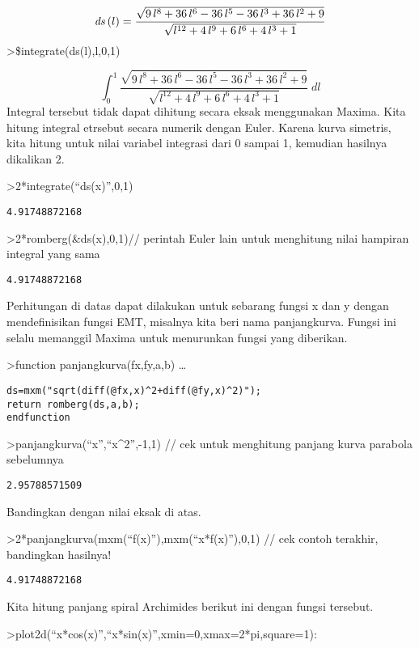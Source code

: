 \documentclass[
]{book}
\begin{document}
\[{\it ds}\left(l\right)=\frac{\sqrt{9\,l^8+36\,l^6-36\,l^5-36\,l^3+  36\,l^2+9}}{\sqrt{l^{12}+4\,l^9+6\,l^6+4\,l^3+1}}\]\textgreater\$integrate(ds(l),l,0,1)

\[\int_{0}^{1}{\frac{\sqrt{9\,l^8+36\,l^6-36\,l^5-36\,l^3+36\,l^2+9}  }{\sqrt{l^{12}+4\,l^9+6\,l^6+4\,l^3+1}}\;dl}\]Integral tersebut tidak dapat dihitung secara eksak menggunakan Maxima. Kita hitung integral etrsebut secara numerik dengan Euler. Karena kurva simetris, kita hitung untuk nilai variabel integrasi dari 0 sampai 1, kemudian hasilnya dikalikan 2.

\textgreater2*integrate(``ds(x)'',0,1)

\begin{verbatim}
4.91748872168
\end{verbatim}

\textgreater2*romberg(\&ds(x),0,1)// perintah Euler lain untuk menghitung nilai hampiran integral yang sama

\begin{verbatim}
4.91748872168
\end{verbatim}

Perhitungan di datas dapat dilakukan untuk sebarang fungsi x dan y dengan mendefinisikan fungsi EMT, misalnya kita beri nama panjangkurva. Fungsi ini selalu memanggil Maxima untuk menurunkan fungsi yang diberikan.

\textgreater function panjangkurva(fx,fy,a,b) \ldots{}

\begin{verbatim}
ds=mxm("sqrt(diff(@fx,x)^2+diff(@fy,x)^2)");
return romberg(ds,a,b);
endfunction
\end{verbatim}

\textgreater panjangkurva(``x'',``x\^{}2'',-1,1) // cek untuk menghitung panjang kurva parabola sebelumnya

\begin{verbatim}
2.95788571509
\end{verbatim}

Bandingkan dengan nilai eksak di atas.

\textgreater2*panjangkurva(mxm(``f(x)''),mxm(``x*f(x)''),0,1) // cek contoh terakhir, bandingkan hasilnya!

\begin{verbatim}
4.91748872168
\end{verbatim}

Kita hitung panjang spiral Archimides berikut ini dengan fungsi tersebut.

\textgreater plot2d(``x*cos(x)'',``x*sin(x)'',xmin=0,xmax=2*pi,square=1):
\end{document}
